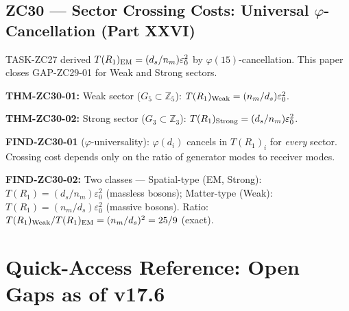 \documentclass[11pt, a4paper]{article}
\newcommand{\Zth}{\mathbb{Z}_3}
\newcommand{\Zfi}{\mathbb{Z}_5}
\begin{document}
\subsection{ZC30 --- Sector Crossing Costs: Universal $\varphi$-Cancellation (Part XXVI)}

\begin{zcbox}[title={ZC30: THM-ZC30-01/02 --- GAP-ZC29-01 Closed}]
\sloppy
TASK-ZC27 derived $T(R_1)_{\rm EM} = (d_s/n_m)\varepsilon_0^2$
by $\varphi(15)$-cancellation.
This paper closes GAP-ZC29-01 for Weak and Strong sectors.

\textbf{THM-ZC30-01:} Weak sector ($G_5 \subset \Zfi$):
$T(R_1)_{\rm Weak} = (n_m/d_s)\varepsilon_0^2$.

\textbf{THM-ZC30-02:} Strong sector ($G_3 \subset \Zth$):
$T(R_1)_{\rm Strong} = (d_s/n_m)\varepsilon_0^2$.

\textbf{FIND-ZC30-01} ($\varphi$-universality): $\varphi(d_i)$ cancels
in $T(R_1)_i$ for \emph{every} sector. Crossing cost depends only on the
ratio of generator modes to receiver modes.

\textbf{FIND-ZC30-02:} Two classes --- Spatial-type (EM, Strong):
$T(R_1) = (d_s/n_m)\varepsilon_0^2$ (massless bosons);
Matter-type (Weak): $T(R_1) = (n_m/d_s)\varepsilon_0^2$ (massive bosons).
Ratio: $T(R_1)_{\rm Weak}/T(R_1)_{\rm EM} = (n_m/d_s)^2 = 25/9$ (exact).
\end{zcbox}

\newpage

\section*{Quick-Access Reference: Open Gaps as of v17.6}
\end{document}
